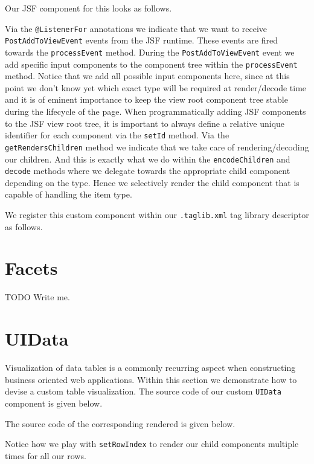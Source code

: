 Our JSF component for this looks as follows.

Via the \texttt{@ListenerFor} annotations we indicate that we want to receive \texttt{PostAddToViewEvent} events from the JSF runtime.
These events are fired towards the \texttt{processEvent} method.
During the \texttt{PostAddToViewEvent} event we add specific input components to the component tree within the \texttt{processEvent} method.
Notice that we add all possible input components here,  since at this point we don't know yet which exact type will be required at render/decode time and it is of eminent importance to keep the view root component tree stable during the lifecycle of the page.
When programmatically adding JSF components to the JSF view root tree, it is important to always define a relative unique identifier for each component via the \texttt{setId} method.
Via the \texttt{getRendersChildren} method we indicate that we take care of rendering/decoding our children.
And this is exactly what we do within the \texttt{encodeChildren} and \texttt{decode} methods where we delegate towards the appropriate child component depending on the type.
Hence we selectively render the child component that is capable of handling the item type.

We register this custom component within our \texttt{.taglib.xml} tag library descriptor as follows.


\section{Facets}
\begin{TODO}{TODO}
	Write me.
\end{TODO}

\section{UIData}
Visualization of data tables is a commonly recurring aspect when constructing business oriented web applications.
Within this section we demonstrate how to devise a custom table visualization.
The source code of our custom \texttt{UIData} component is given below.


The source code of the corresponding rendered is given below.

Notice how we play with \texttt{setRowIndex} to render our child components multiple times for all our rows.

